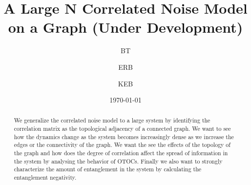 \documentclass[aps,pra,reprint,amsmath,amssymb]{revtex4-2}
\begin{document}
\title{
A Large N Correlated Noise Model on a Graph (Under Development)}

\author{BT}
\author{ERB}
\author{KEB}
\date{\today}


\begin{abstract}
We generalize the correlated noise model to a large system by identifying the correlation matrix as the topological adjacency of a connected graph. We want to see how the dynamics change as the system becomes increasingly dense as we increase the edges or the connectivity of the graph. We want the see the effects of the topology of the graph and how does the degree of correlation affect the spread of information in the system by analysing the behavior of OTOCs. Finally we also want to strongly characterize the amount of entanglement in the system by calculating the entanglement negativity. 
\end{abstract}



\maketitle
\end{document}
